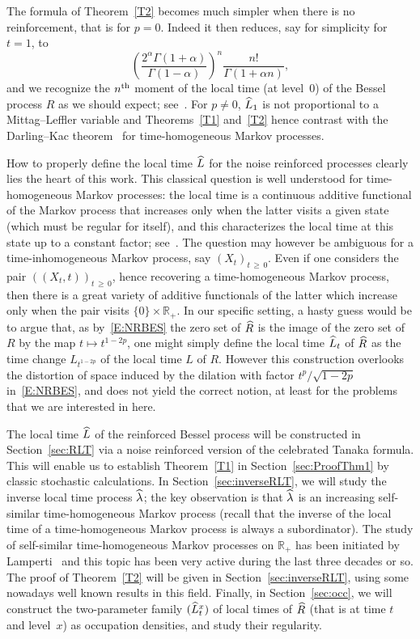 \documentclass[AHL,Unicode,longabstracts,published]{cedram}
\renewcommand{\hat}[1]{\widehat{#1}}
\newcommand{\R}{\mathbb{R}}
\let\oldhat\hat
\renewcommand*{\hat}[1]{\mathchoice{\widehat{#1}}{\widehat{#1}}{\oldhat{#1}}{\oldhat{#1}}}
\begin{document}
The formula of Theorem~\ref{T2} becomes much simpler when there is no reinforcement, that is for $p=0$. Indeed it then reduces, say for simplicity for $t=1$, to
\[
\left(\frac{2^{\alpha}\Gamma(1+\alpha)}{\Gamma(1-\alpha)}\right)^n \frac{n!}{\Gamma(1+\alpha n)},
\]
and we recognize the $n^{\rm th}$ moment of the local time (at level~$0$) of the Bessel process $R$ as we should expect; see~\cite[Proposition~3.4]{DRVY}. For $p\neq 0$, $\hat{L}_1$ is not proportional to a Mittag--Leffler variable and Theorems~\ref{T1} and~\ref{T2} hence contrast with the Darling--Kac theorem~\cite{DK} for time-homogeneous Markov processes.

How to properly define the local time $\hat{L}$ for the noise reinforced processes clearly lies the heart of this work. This classical question is well understood for time-homogeneous Markov processes: the local time is a continuous additive functional of the Markov process that increases only when the latter visits a given state (which must be regular for itself), and this characterizes the local time at this state up to a constant factor; see~\cite[Definition~V.3.12 and Theorem~VI.3.13]{BlGe}. The question may however be ambiguous for a time-inhomogeneous Markov process, say $(X_t)_{t\,\geq \,0}$. Even if one considers the pair $((X_t,t))_{t\,\geq\,0}$, hence recovering a time-homogeneous Markov process, then there is a great variety of additive functionals of the latter which increase only when the pair visits $\{0\}\times \R_+$. In our specific setting, a hasty guess would be to argue that, as by~\eqref{E:NRBES} the zero set of $\hat R$ is the image of the zero set of $R$ by the map $t\mapsto t^{1-2p}$, one might simply define the local time $\hat{L}_t$ of $\hat R$ as the time change ${L}_{t^{1-2p}}$ of the local time ${L}$ of $R$. However this construction overlooks the distortion of space induced by the dilation with factor $t^p/\sqrt{1-2p}$ in~\eqref{E:NRBES}, and does not yield the correct notion, at least for the problems that we are interested in here.

The local time $\hat{L}$ of the reinforced Bessel process will be constructed in Section~\ref{sec:RLT} via a noise reinforced version of the celebrated Tanaka formula. This will enable us to establish Theorem~\ref{T1} in Section~\ref{sec:ProofThm1} by classic stochastic calculations. In Section~\ref{sec:inverseRLT}, we will study the inverse local time process $\hat \lambda$; the key observation is that $\hat \lambda$ is an increasing self-similar time-homogeneous Markov process (recall that the inverse of the local time of a time-homogeneous Markov process is always a subordinator). The study of self-similar time-homogeneous Markov processes on $\R_+$ has been initiated by Lamperti~\cite{Lamperti} and this topic has been very active during the last three decades or so. The proof of Theorem~\ref{T2} will be given in Section~\ref{sec:inverseRLT}, using some nowadays well known results in this field. Finally, in Section~\ref{sec:occ}, we will construct the two-parameter family $(\hat{L}^x_t)$ of local times of $\hat R$ (that is at time $t$ and level~$x$) as occupation densities, and study their regularity.
\end{document}
